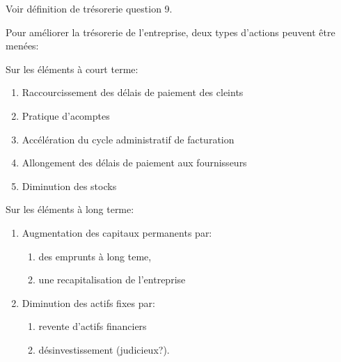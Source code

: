 \documentclass{article}
\begin{document}
Voir définition de trésorerie question 9.

Pour améliorer la trésorerie de l'entreprise, deux types d'actions peuvent être menées:

Sur les éléments à court terme:
\begin{enumerate}
	\item Raccourcissement des délais de paiement des cleints
	\item Pratique d'acomptes
	\item Accélération du cycle administratif de facturation
	\item Allongement des délais de paiement aux fournisseurs
	\item Diminution des stocks
\end{enumerate}
Sur les éléments à long terme:
\begin{enumerate}
	\item Augmentation des capitaux permanents par:
	\begin{enumerate}
		\item des emprunts à long teme,
		\item une recapitalisation de l'entreprise
	\end{enumerate}
	\item Diminution des actifs fixes par:
	\begin{enumerate}
		\item revente d'actifs financiers
		\item désinvestissement (judicieux?).
	\end{enumerate}
\end{enumerate}


\end{document}
